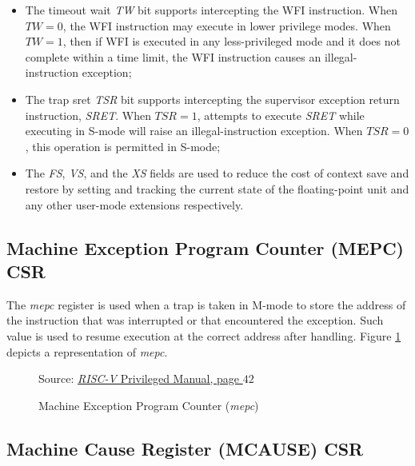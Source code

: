\begin{itemize}
  \item The timeout wait \textit{TW} bit supports intercepting the WFI
    instruction. When $\textit{TW}=0$, the WFI instruction may execute in lower
    privilege modes. When $\textit{TW}=1$, then if WFI is executed in any less-privileged
    mode and it does not complete within a time limit, the WFI instruction causes
    an illegal-instruction exception;

  \item The trap sret \textit{TSR} bit supports intercepting the supervisor
    exception return instruction, \textit{SRET}. When $\textit{TSR}=1$, attempts
    to execute \textit{SRET} while executing in S-mode will raise an illegal-instruction
    exception. When $\textit{TSR}=0$, this operation is permitted in S-mode;

  \item The \textit{FS}, \textit{VS}, and the \textit{XS} fields are used to
    reduce the cost of context save and restore by setting and tracking the
    current state of the floating-point unit and any other user-mode extensions
    respectively.
\end{itemize}

\subsection{Machine Exception Program Counter (MEPC) CSR}
\label{subsec:mepc}

The \textit{mepc} register is used when a trap is taken in M-mode to store the address
of the instruction that was interrupted or that encountered the exception. Such
value is used to resume execution at the correct address after handling. Figure \ref{fig:mepc}
depicts a representation of \textit{mepc}. \\
\begin{figure}[H]
  \centering
  \def\stackalignment{r} %
  {\scriptsize Source: \href{https://drive.google.com/file/d/17GeetSnT5wW3xNuAHI95-SI1gPGd5sJ_/view}{\textit{RISC-V} Privileged Manual, page $42$}}
  \caption{Machine Exception Program Counter (\textit{mepc})}
  \label{fig:mepc}
\end{figure}

\subsection{Machine Cause Register (MCAUSE) CSR}
\label{subsec:mcause}

